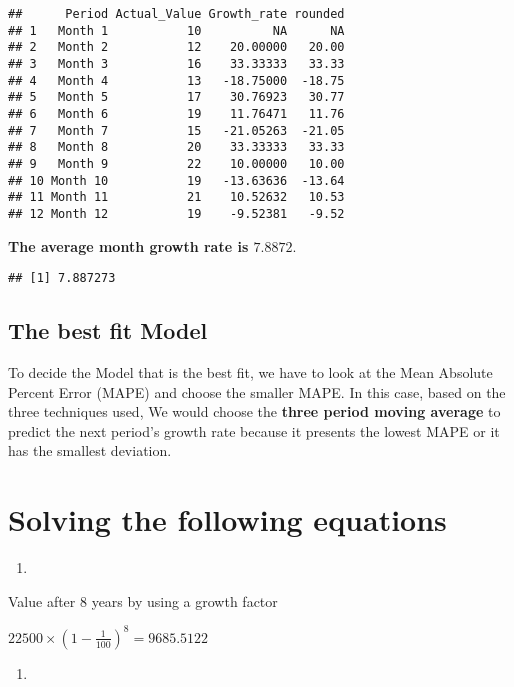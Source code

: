 \documentclass[
]{article}
\begin{document}
\begin{verbatim}
##      Period Actual_Value Growth_rate rounded
## 1   Month 1           10          NA      NA
## 2   Month 2           12    20.00000   20.00
## 3   Month 3           16    33.33333   33.33
## 4   Month 4           13   -18.75000  -18.75
## 5   Month 5           17    30.76923   30.77
## 6   Month 6           19    11.76471   11.76
## 7   Month 7           15   -21.05263  -21.05
## 8   Month 8           20    33.33333   33.33
## 9   Month 9           22    10.00000   10.00
## 10 Month 10           19   -13.63636  -13.64
## 11 Month 11           21    10.52632   10.53
## 12 Month 12           19    -9.52381   -9.52
\end{verbatim}

\textbf{The average month growth rate is \(7.8872\)}.

\begin{verbatim}
## [1] 7.887273
\end{verbatim}

\hypertarget{the-best-fit-model}{%
\subsection{The best fit Model}\label{the-best-fit-model}}

To decide the Model that is the best fit, we have to look at the Mean
Absolute Percent Error (MAPE) and choose the smaller MAPE. In this case,
based on the three techniques used, We would choose the \textbf{three
period moving average} to predict the next period's growth rate because
it presents the lowest MAPE or it has the smallest deviation.

\hypertarget{solving-the-following-equations}{%
\section{Solving the following
equations}\label{solving-the-following-equations}}

\begin{enumerate}
\def\labelenumi{\alph{enumi}.}
\item
\end{enumerate}

Value after 8 years by using a growth factor

\(22500\times(1-\frac{1}{100})^8=9685.5122\)

\begin{enumerate}
\def\labelenumi{\alph{enumi}.}
\setcounter{enumi}{1}
\item
\end{enumerate}
\end{document}

